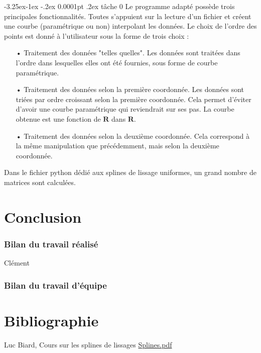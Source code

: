 \documentclass[a4paper,12pt]{article} %
\makeatletter
\renewcommand\paragraph{\@startsection{paragraph}{4}{\z@}%
                                      {-3.25ex\@plus -1ex \@minus -.2ex}%
                                      {0.0001pt \@plus .2ex}%
                                      {\normalfont\normalsize\bfseries}}
\makeatother
\begin{document}
\paragraph{tâche 0}
Le programme adapté possède trois principales fonctionnalités. Toutes s'appuient sur la lecture d'un fichier et créent une courbe (paramétrique ou non) interpolant les données.
Le choix de l'ordre des points est donné à l'utilisateur sous la forme de trois choix : 


\begin{itemize}
    \item[•] Traitement des données "telles quelles". Les données sont traitées dans l'ordre dans lesquelles elles ont été fournies, sous forme de courbe paramétrique.
    \item[•] Traitement des données selon la première coordonnée. Les données sont triées par ordre croissant selon la première coordonnée. Cela permet d'éviter d'avoir une courbe paramétrique qui reviendrait sur ses pas. La courbe obtenue est une fonction de $\mathbf{R}$ dans $\mathbf{R}$.
    \item[•] Traitement des données selon la deuxième coordonnée. Cela correspond à la même manipulation que précédemment, mais selon la deuxième coordonnée.
\end{itemize}
Dans le fichier python dédié aux splines de lissage uniformes, un grand nombre de matrices sont calculées.

\renewcommand\partname{}
\part{Conclusion}
	\section{Bilan du travail réalisé}
	Clément
	\section{Bilan du travail d'équipe}
	


\renewcommand\partname{}
\part{Bibliographie}

Luc Biard, Cours sur les splines de lissages
\href{http://www-ljk.imag.fr/membres/Luc.Biard/L3MI_cours/Splines.pdf}{Splines.pdf}
\end{document}
